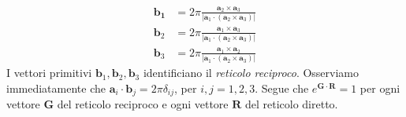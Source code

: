 \documentclass{article}
\begin{document}
\begin{align}
    \mathbf{b_1} &= 2\pi\frac{\mathbf{a}_2 \times \mathbf{a}_3}{|\mathbf{a}_1 \cdot (\mathbf{a}_2 \times \mathbf{a}_3)|} \tag{4.1.10} \\
    \mathbf{b}_2 &= 2\pi\frac{\mathbf{a}_1 \times \mathbf{a}_3}{|\mathbf{a}_1 \cdot (\mathbf{a}_2 \times \mathbf{a}_3)|} \tag{4.1.11} \\
    \mathbf{b}_3 &= 2\pi\frac{\mathbf{a}_1 \times \mathbf{a}_2}{|\mathbf{a}_1 \cdot (\mathbf{a}_2 \times \mathbf{a}_3)|} \tag{4.1.12}
\end{align}
I vettori primitivi $\mathbf{b}_1, \mathbf{b}_2, \mathbf{b}_3$ identificiano il \textit{reticolo reciproco}. Osserviamo immediatamente che $\mathbf{a}_i \cdot \mathbf{b}_j = 2\pi\delta_{ij}$, per $i, j = 1, 2, 3$. Segue che $e^{\mathbf{G} \cdot \mathbf{R}} = 1$ per ogni vettore $\mathbf{G}$ del reticolo reciproco e ogni vettore $\mathbf{R}$ del reticolo diretto.

\newpage
\end{document}
